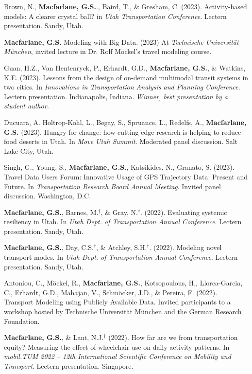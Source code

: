 \documentclass[margin,line]{res}
\newcounter{enuminitialize}
\newenvironment{myenum}[1][]
{%
 \setcounter{enuminitialize}{#1}
 \addtocounter{enuminitialize}{2}
 \begin{enumerate}[left= 4pt, itemsep=8pt, start=\value{enuminitialize}, label=\arabic*\addtocounter{enumi}{-2}]
}
{%
 \end{enumerate}
}
\begin{document}
\begin{resume}
\begin{myenum}[34]
{\item Brown, N., \textbf{Macfarlane, G.S.}., Baird, T., \& Gresham, C. (2023). Activity-based models: A clearer crystal ball? in \textit{Utah Transportation Conference}. Lectern presentation. Sandy, Utah.
\item \textbf{Macfarlane, G.S.} Modeling with Big Data. (2023) At \textit{Technische Universit\"at M\"unchen}, invited lecture in Dr. Rolf M\"ockel's travel modeling course.
\item Guan, H.Z., Van Hentenryck, P., Erhardt, G.D., \textbf{Macfarlane, G.S.}, \& Watkins, K.E. (2023). Lessons from the design of on-demand multimodal transit systems in two cities. In \textit{Innovations in Transportation Analysis and Planning Conference}. Lectern presentation. Indianapolis, Indiana. \textit{Winner, best presentation by a student author.}
\item Ducuara, A. Holtrop-Kohl, L., Begay, S., Spruance, L., Redelfs, A., \textbf{Macfarlane, G.S.} (2023). Hungry for change: how cutting-edge research is helping to reduce food deserts in Utah. In \textit{Move Utah Summit}. Moderated panel discussion. Salt Lake City, Utah.
\item Singh, G., Young, S., \textbf{Macfarlane, G.S.}, Katsikides, N., Granato, S. (2023). Travel Data Users Forum: Innovative Usage of GPS Trajectory Data: Present and Future. In \textit{Transportation Research Board Annual Meeting}. Invited panel discussion. Washington, D.C.
\item \textbf{Macfarlane, G.S.}, Barnes, M.$^\dagger$, \& Gray, N.$^\dagger$. (2022). Evaluating systemic resiliency in Utah. In \textit{Utah Dept. of Transportation Annual Conference}. Lectern presentation. Sandy, Utah.
\item \textbf{Macfarlane, G.S.}, Day, C.S.$^\dagger$, \& Atchley, S.H.$^\dagger$. (2022). Modeling novel transport modes. In \textit{Utah Dept. of Transportation Annual Conference}. Lectern presentation. Sandy, Utah.
\item Antoniou, C., M\"ockel, R., \textbf{Macfarlane, G.S.}, Kotsopoulous, H., Llorca-Garcia, C., Erhardt, G.D., Mahajan, V.,  Schm\"ocker, J.D., \& Pereira, F. (2022). Transport Modeling using Publicly Available Data. Invited participants to a workshop hosted by Technische Universit\"at M\"unchen and the German Research Foundation.
\item \textbf{Macfarlane, G.S.}, \& Lant, N.J.$^\dagger$ (2022). How far are we from transportation equity? Measuring the effect of wheelchair use on daily activity patterns. In \textit{mobil.TUM 2022 – 12th International Scientific Conference on Mobility and Transport}. Lectern presentation. Singapore.
}
\end{myenum}
\end{resume}
\end{document}
